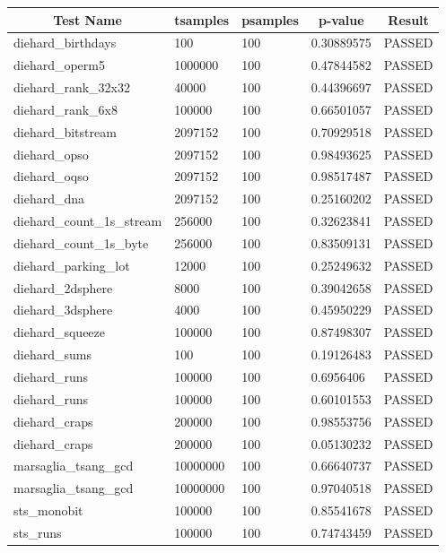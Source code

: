 \documentclass[titlepage, 11pt]{article}
\begin{document}
\begin{table}[!htb]
\begin{tabular}{l|l|l|l|c}
\hline
\multicolumn{1}{c|}{\textbf{Test Name}} & \multicolumn{1}{c|}{\textbf{tsamples}} & \multicolumn{1}{c|}{\textbf{psamples}} & \multicolumn{1}{c|}{\textbf{p-value}} & \textbf{Result} \\ \hline
diehard\_birthdays & 100 & 100 & 0.30889575 & PASSED \\
diehard\_operm5 & 1000000 & 100 & 0.47844582 & PASSED \\
diehard\_rank\_32x32 & 40000 & 100 & 0.44396697 & PASSED \\
diehard\_rank\_6x8 & 100000 & 100 & 0.66501057 & PASSED \\
diehard\_bitstream & 2097152 & 100 & 0.70929518 & PASSED \\
diehard\_opso & 2097152 & 100 & 0.98493625 & PASSED \\
diehard\_oqso & 2097152 & 100 & 0.98517487 & PASSED \\
diehard\_dna & 2097152 & 100 & 0.25160202 & PASSED \\
diehard\_count\_1s\_stream & 256000 & 100 & 0.32623841 & PASSED \\
diehard\_count\_1s\_byte & 256000 & 100 & 0.83509131 & PASSED \\
diehard\_parking\_lot & 12000 & 100 & 0.25249632 & PASSED \\
diehard\_2dsphere & 8000 & 100 & 0.39042658 & PASSED \\
diehard\_3dsphere & 4000 & 100 & 0.45950229 & PASSED \\
diehard\_squeeze & 100000 & 100 & 0.87498307 & PASSED \\
diehard\_sums & 100 & 100 & 0.19126483 & PASSED \\
diehard\_runs & 100000 & 100 & 0.6956406 & PASSED \\
diehard\_runs & 100000 & 100 & 0.60101553 & PASSED \\
diehard\_craps & 200000 & 100 & 0.98553756 & PASSED \\
diehard\_craps & 200000 & 100 & 0.05130232 & PASSED \\
marsaglia\_tsang\_gcd & 10000000 & 100 & 0.66640737 & PASSED \\
marsaglia\_tsang\_gcd & 10000000 & 100 & 0.97040518 & PASSED \\
sts\_monobit & 100000 & 100 & 0.85541678 & PASSED \\
sts\_runs & 100000 & 100 & 0.74743459 & PASSED \\

\end{tabular}
\end{table}
\end{document}
